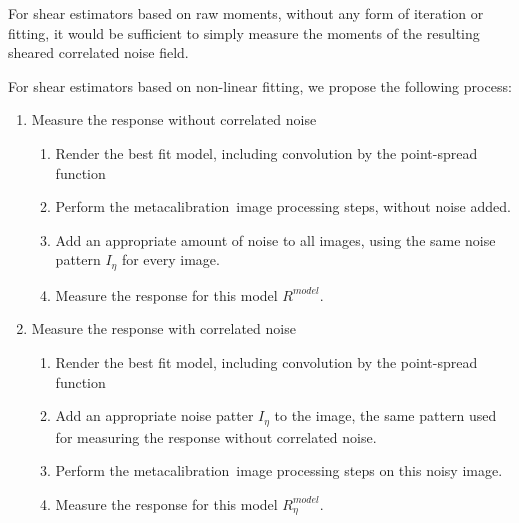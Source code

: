 \documentclass[usegraphicx,usenatbib]{mn2e}
\newcommand{\mcal}{metacalibration}
\begin{document}
For shear estimators based on raw moments, without any form of iteration or
fitting, it would be sufficient to simply measure the moments of the resulting
sheared correlated noise field.

For shear estimators based on non-linear fitting, we propose the following
process:
\begin{enumerate}[label=\arabic*.]

    \item Measure the response without correlated noise
    
        \begin{enumerate}[label*=\arabic*.]
            \item Render the best fit model, including convolution by the point-spread
                function

            \item Perform the \mcal\ image processing steps, without noise added.

            \item Add an appropriate amount of noise to all images, using the
                same noise pattern $I_\eta$ for every image.

            \item Measure the response for this model $R^{model}$.
        \end{enumerate}

    \item Measure the response with correlated noise
    
        \begin{enumerate}[label*=\arabic*.]
            \item Render the best fit model, including convolution by the point-spread
                function

            \item Add an appropriate noise patter $I_\eta$ to the image, the
                same pattern used for measuring the response without correlated
                noise.

            \item Perform the \mcal\ image processing steps on this noisy
                image.

            \item Measure the response for this model $R^{model}_{\eta}$.

        \end{enumerate}

\end{enumerate}
\end{document}
